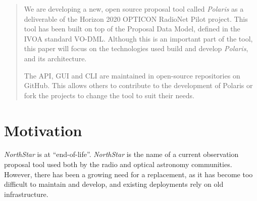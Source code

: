\documentclass[11pt,twoside]{article}
\begin{document}
\begin{abstract}
    We are developing a new, open source proposal tool called \emph{Polaris} as a deliverable of the Horizon
    2020 OPTICON RadioNet Pilot project.
    This tool has been built on top of the Proposal Data Model, defined in the IVOA standard VO-DML\@.
    Although this is an important part of the tool, this paper will focus on the technologies
    used build and develop \emph{Polaris}, and its architecture.

    The API, GUI and CLI are maintained in open-source repositories on GitHub.
    This allows others to contribute to the development of Polaris or fork the projects to change the tool
    to suit their needs.
\end{abstract}






\section{Motivation}\label{sec:motivation}
\emph{NorthStar} is at ``end-of-life''.
\emph{NorthStar} is the name of a current observation proposal tool used both by the radio and optical
astronomy communities.
However, there has been a growing need for a replacement, as it has become too difficult to maintain and develop,
and existing deployments rely on old infrastructure.
\end{document}
